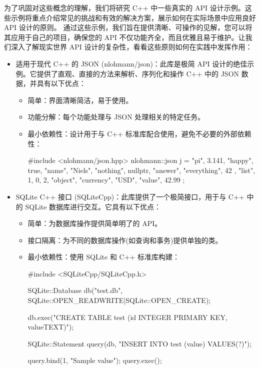 为了巩固对这些概念的理解，我们将研究 C++ 中一些真实的 API 设计示例。这些示例将重点介绍常见的挑战和有效的解决方案，展示如何在实际场景中应用良好 API 设计的原则。
通过这些示例，我们旨在提供清晰、可操作的见解，您可以将其应用于自己的项目，确保您的 API 不仅功能齐全，而且优雅且易于维护。让我们深入了解现实世界 API 设计的复杂性，看看这些原则如何在实践中发挥作用：

\begin{itemize}
\item
适用于现代 C++ 的 JSON (nlohmann/json)：此库是极简 API 设计的绝佳示例。它提供了直观、直接的方法来解析、序列化和操作 C++ 中的 JSON 数据，并具有以下优点：

\begin{itemize}
\item
简单：界面清晰简洁，易于使用。

\item
功能分解：每个功能处理与 JSON 处理相关的特定任务。

\item
最小依赖性：设计用于与 C++ 标准库配合使用，避免不必要的外部依赖性：

\begin{cpp}
#include <nlohmann/json.hpp>
nlohmann::json j = {
    {"pi", 3.141},
    {"happy", true},
    {"name", "Niels"},
    {"nothing", nullptr},
    {"answer", {
            {"everything", 42}
    }},
    {"list", {1, 0, 2}},
    {"object", {
            {"currency", "USD"},
            {"value", 42.99}
    }}
};
\end{cpp}
\end{itemize}

\item
SQLite C++ 接口 (SQLiteCpp)：此库提供了一个极简接口，用于与 C++ 中的 SQLite 数据库进行交互。它具有以下优点：

\begin{itemize}
\item
简单：为数据库操作提供简单明了的 API。

\item
接口隔离：为不同的数据库操作(如查询和事务)提供单独的类。

\item
最小依赖性：使用 SQLite 和 C++ 标准库构建：

\begin{cpp}
#include <SQLiteCpp/SQLiteCpp.h>

SQLite::Database db("test.db", SQLite::OPEN_READWRITE|SQLite::OPEN_CREATE);

db.exec("CREATE TABLE test (id INTEGER PRIMARY KEY, valueTEXT)");

SQLite::Statement query(db, "INSERT INTO test (value) VALUES(?)");

query.bind(1, "Sample value");
query.exec();
\end{cpp}
\end{itemize}
\end{itemize}






















